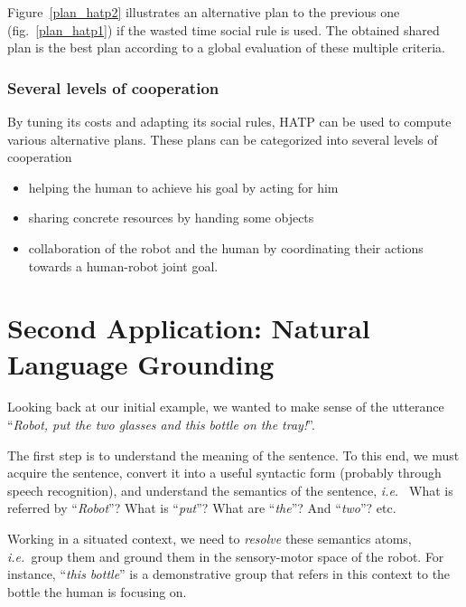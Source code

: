 \documentclass{svmult}
\newcommand{\ie}{{\textit{i.e.~}}}
\begin{document}
Figure~\ref{plan_hatp2} illustrates an alternative plan to the previous 
one (fig.~\ref{plan_hatp1}) if the wasted time social rule is used.
The obtained shared plan is the best plan according to a global evaluation of
these multiple criteria.

\subsubsection{Several levels of cooperation} 

By tuning its costs and adapting its social rules, HATP can be used to compute
various alternative plans. These plans can be categorized into several levels
of cooperation

\begin{itemize}
\item helping the human to achieve his goal by acting for him
\item sharing concrete resources by handing some objects
\item collaboration of the robot and the human by coordinating their
  actions towards a human-robot joint goal.
\end{itemize}




\section{Second Application: Natural Language Grounding}
\label{dialogs}

Looking back at our initial example, we wanted to make sense of the utterance
``\emph{Robot, put the two glasses and this bottle on the tray!}''.

The first step is to understand the meaning of the sentence. To this end, we
must acquire the sentence, convert it into a useful syntactic form (probably
through speech recognition), and understand the semantics of the sentence, \ie
What is referred by ``\textit{Robot}''? What is ``\textit{put}''? What are
``\textit{the}''? And ``\textit{two}''? etc.

Working in a situated context, we need to \emph{resolve} these semantics atoms,
\ie group them and ground them in the sensory-motor space of the robot. For instance,
``\textit{this bottle}'' is a demonstrative group that refers in this context to the
bottle the human is focusing on.
\end{document}
